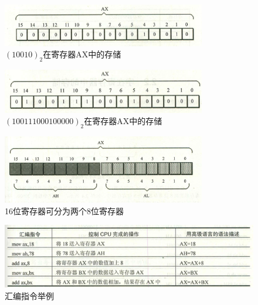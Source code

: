 \begin{frame}
  \begin{figure}
    \centering
    \includegraphics[width=3.5in]{ch01/images/tongyongjicunqi2}
    \caption{$(10010)_2$在寄存器AX中的存储}
  \end{figure}
  
  \begin{figure}
    \centering
    \includegraphics[width=3.5in]{ch01/images/tongyongjicunqi3}
    \caption{$(100111000100000)_2$在寄存器AX中的存储}
  \end{figure}
\end{frame}
% 
% 
% 
\begin{frame}
  \begin{figure}
    \centering
    \includegraphics[width=3.5in]{ch01/images/tongyongjicunqi4}
    \caption{16位寄存器可分为两个8位寄存器}
  \end{figure}
\end{frame}

\begin{frame}
  \begin{figure}
    \centering
    \includegraphics[width=4.5in]{ch01/images/huibianzhiling1}
    \caption{汇编指令举例}
  \end{figure}
\end{frame}


